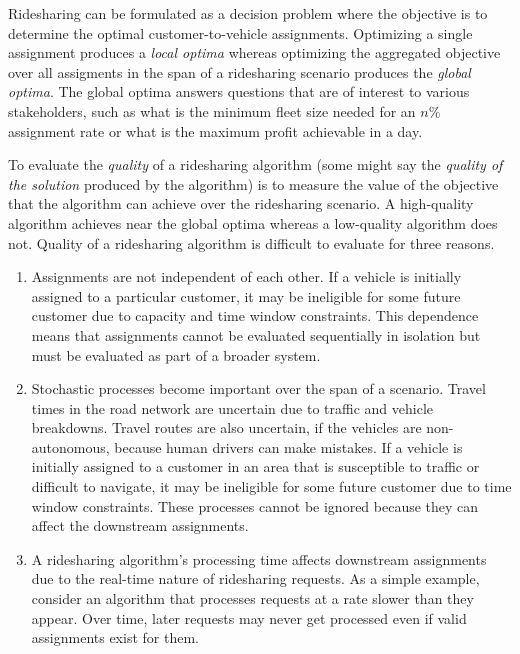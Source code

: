 \renewcommand{\thepage}{\arabic{page}}
\setcounter{page}{1}

Ridesharing can be formulated as a decision problem where the objective is to
determine the optimal customer-to-vehicle assignments. Optimizing a single
assignment produces a \emph{local optima} whereas optimizing the aggregated
objective over all assigments in the span of a ridesharing scenario produces
the \emph{global optima}. The global optima answers questions that are of
interest to various stakeholders, such as what is the minimum fleet size needed
for an $n$\% assignment rate or what is the maximum profit achievable in a day.

To evaluate the \emph{quality} of a ridesharing algorithm (some might say the
\emph{quality of the solution} produced by the algorithm) is to measure the
value of the objective that the algorithm can achieve over the ridesharing
scenario. A high-quality algorithm achieves near the global optima whereas a
low-quality algorithm does not. Quality of a ridesharing algorithm is difficult
to evaluate for three reasons.
\begin{enumerate}
\item {} Assignments are not independent of each
other. If a vehicle is initially assigned to a particular customer, it may be
ineligible for some future customer due to capacity and time window
constraints. This dependence means that assignments cannot be evaluated
sequentially in isolation but must be evaluated as part of a broader system.
\item {} Stochastic processes become important over the
span of a scenario.  Travel times in the road network are uncertain due to
traffic and vehicle breakdowns. Travel routes are also uncertain, if the
vehicles are non-autonomous, because human drivers can make mistakes.  If a
vehicle is initially assigned to a customer in an area that is susceptible to
traffic or difficult to navigate, it may be ineligible for some future customer
due to time window constraints. These processes cannot be ignored because they
can affect the downstream assignments.
\item {} A ridesharing algorithm's processing time
affects downstream assignments due to the real-time nature of ridesharing
requests. As a simple example, consider an algorithm that processes requests at
a rate slower than they appear. Over time, later requests may never get
processed even if valid assignments exist for them.
\end{enumerate}

